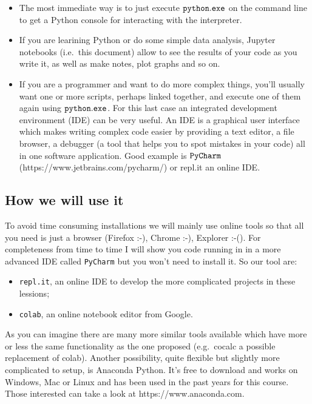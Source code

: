\documentclass[11pt]{article}
\providecommand{\tightlist}{%
      \setlength{\itemsep}{0pt}\setlength{\parskip}{0pt}}
\begin{document}
\begin{itemize}
\tightlist
\item
  The most immediate way is to just execute \(\tt{python.exe}\) on the
  command line to get a Python console for interacting with the
  interpreter.
\item
  If you are learining Python or do some simple data analysis, Jupyter
  notebooks (i.e.~this document) allow to see the results of your code
  as you write it, as well as make notes, plot graphs and so on.
\item
  If you are a programmer and want to do more complex things, you'll
  usually want one or more scripts, perhaps linked together, and execute
  one of them again using \(\tt{python.exe}\). For this last case an
  integrated development environment (IDE) can be very useful. An IDE is
  a graphical user interface which makes writing complex code easier by
  providing a text editor, a file browser, a debugger (a tool that helps
  you to spot mistakes in your code) all in one software application.
  Good example is \(\tt{PyCharm}\) (https://www.jetbrains.com/pycharm/)
  or repl.it an online IDE.
\end{itemize}

\hypertarget{how-we-will-use-it}{%
\subsection{How we will use it}\label{how-we-will-use-it}}

To avoid time consuming installations we will mainly use online tools so
that all you need is just a browser (Firefox :-), Chrome :-), Explorer
:-(). For completeness from time to time I will show you code running in
in a more advanced IDE called \texttt{PyCharm} but you won't need to
install it. So our tool are:

\begin{itemize}
\tightlist
\item
  \texttt{repl.it}, an online IDE to develop the more complicated
  projects in these lessions;
\item
  \texttt{colab}, an online notebook editor from Google.
\end{itemize}

As you can imagine there are many more similar tools available which
have more or less the same functionality as the one proposed
(e.g.~cocalc a possible replacement of colab). Another possibility,
quite flexible but slightly more complicated to setup, is Anaconda
Python. It's free to download and works on Windows, Mac or Linux and has
been used in the past years for this course. Those interested can take a
look at https://www.anaconda.com.
\end{document}
